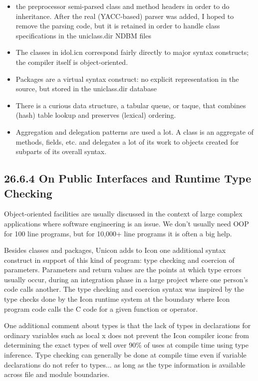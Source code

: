 \liststyleLxliv
\begin{itemize}
\item 
the preprocessor semi-parsed class and method headers in order to do inheritance. After the real (YACC-based) parser was
added, I hoped to remove the parsing code, but it is retained in order to handle class specifications in the
uniclass.dir NDBM files 
\item 
The classes in idol.icn correspond fairly directly to major syntax constructs; the compiler itself is object-oriented. 
\item 
Packages are a {\textquotedbl}virtual syntax construct{\textquotedbl}: no explicit representation in the source, but
stored in the uniclass.dir database 
\item 
There is a curious data structure, a tabular queue, or taque, that combines (hash) table lookup and preserves (lexical)
ordering. 
\item 
Aggregation and delegation patterns are used a lot. A class is an aggregate of methods, fields, etc. and delegates a lot
of its work to objects created for subparts of its overall syntax. 
\end{itemize}

\subsection[26.6.4 On Public Interfaces and Runtime Type Checking]{26.6.4 On Public Interfaces and Runtime Type Checking}

Object-oriented facilities are usually discussed in the context of
large complex applications where software engineering is an issue. We
don't usually need OOP for 100 line programs, but for 10,000+ line
programs it is often a big help.

Besides classes and packages, Unicon adds to Icon one additional
syntax construct in support of this kind of program: type checking and
coercion of parameters. Parameters and return values are the points at
which type errors usually occur, during an integration phase in a
large project where one person's code calls another. The type checking
and coercion syntax was inspired by the type checks done by the Icon
runtime system at the boundary where Icon program code calls the C
code for a given function or operator.


One additional comment about types is that the lack of types in
declarations for ordinary variables such as {\textquotedbl}local
x{\textquotedbl} does not prevent the Icon compiler iconc from
determining the exact types of well over 90\% of uses at compile time
using type inference. Type checking can generally be done at compile
time even if variable declarations do not refer to types... as long as
the type information is available across file and module boundaries.
